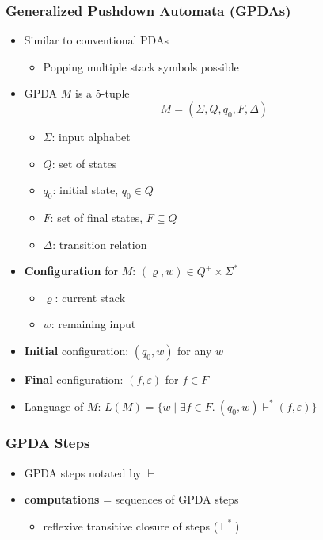 \documentclass{beamer}
\newcommand{\concept}[1]{\textbf{#1}}
\begin{document}
\begin{frame}
  \frametitle{Generalized Pushdown Automata (GPDAs)}
  \begin{itemize}
    \item Similar to conventional PDAs
    \begin{itemize}
      \item Popping multiple stack symbols possible
    \end{itemize}
    \item GPDA $M$ is a 5-tuple
    \[ M = (\varSigma, Q, q_0, F, \varDelta) \]
    \vspace{-25 pt}
    \begin{itemize}
      \item $\varSigma$: input alphabet
      \item $Q$: set of states
      \item $q_0$: initial state, $q_0 \in Q$
      \item $F$: set of final states, $F \subseteq Q$
      \item $\varDelta$: transition relation
    \end{itemize}
    \vspace{2.5 pt}
    \item \concept{Configuration} for $M$:
    $(\varrho, w) \in Q^+ \times \varSigma^*$
    \begin{itemize}
      \item $\varrho$: current stack 
      \item $w$: remaining input
    \end{itemize}
    \item \concept{Initial} configuration: $(q_0, w)$ for any $w$
    \item \concept{Final} configuration: $(f, \varepsilon)$ for $f \in F$ 
    \item Language of $M$:
    $L(M) = \{w \mid \exists f \in F.\ (q_0, w) \vdash^* (f, \varepsilon)\}$
  \end{itemize}
\end{frame}

\begin{frame}
  \frametitle{GPDA Steps}
  \begin{itemize}
    \item GPDA steps notated by $\vdash$
    \item \concept{computations} = sequences of GPDA steps
    \begin{itemize}
      \item reflexive transitive closure of steps ($\vdash^*$)
    \end{itemize}
  \end{itemize}
\end{frame}
\end{document}
